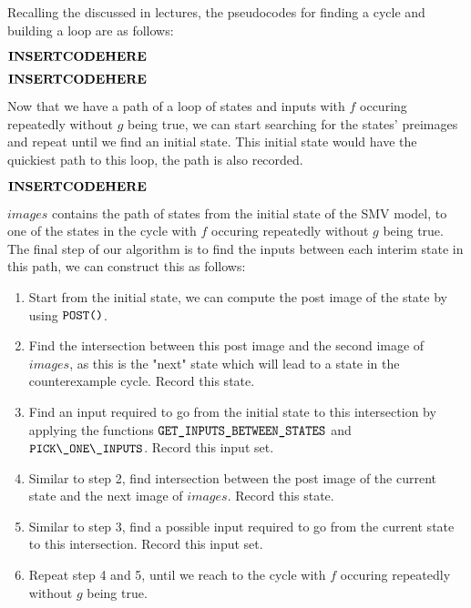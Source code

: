 \documentclass{article}
\begin{document}
Recalling the  discussed in lectures, the pseudocodes for finding a cycle and building a loop are as follows:

$\bf{INSERT CODE HERE}$

$\bf{INSERT CODE HERE}$

Now that we have a path of a loop of states and inputs with $f$ occuring repeatedly without $g$ being true, we can start searching for the states' preimages and repeat until we find an initial state. This initial state would have the quickiest path to this loop, the path is also recorded.

$\bf{INSERT CODE HERE}$

$images$ contains the path of states from the initial state of the SMV model, to one of the states in the cycle with $f$ occuring repeatedly without $g$ being true. The final step of our algorithm is to find the inputs between each interim state in this path, we can construct this as follows:

\begin{enumerate}
    \item Start from the initial state, we can compute the post image of the state by using $\verb|POST()|$.
    \item Find the intersection between this post image and the second image of $images$, as this is the "next" state which will lead to a state in the counterexample cycle. Record this state.
    \item Find an input required to go from the initial state to this intersection by applying the functions $\verb|GET_INPUTS_BETWEEN_STATES|$ and $\verb|PICK\_ONE\_INPUTS|$. Record this input set.
    \item Similar to step 2, find intersection between the post image of the current state and the next image of $images$. Record this state.
    \item Similar to step 3, find a possible input required to go from the current state to this intersection. Record this input set.
    \item Repeat step 4 and 5, until we reach to the cycle with $f$ occuring repeatedly without $g$ being true.
\end{enumerate}

\medskip
\end{document}

